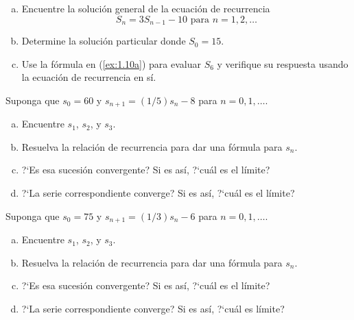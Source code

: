 \begin{solution}

\end{solution}

\begin{exercise}
\begin{enumerate}[(a)]
	\item Encuentre la solución general de la ecuación de recurrencia \[ S_{n}=3S_{n-1}-10\text{ para }n=1,2,\ldots \]\label{ex:1.10a}
	\item Determine la solución particular donde $S_{0}=15$.
	\item Use la fórmula en (\eqref{ex:1.10a}) para evaluar $S_6$ y verifique su respuesta usando la ecuación de recurrencia en sí.
\end{enumerate}
\end{exercise}

\begin{solution}
	
\end{solution}

\begin{exercise}
Suponga que $s_{0}=60$ y $s_{n+1}=(1/5)s_n-8$ para $n=0,1,\ldots$.
\begin{enumerate}[(a)]
	\item Encuentre $s_{1}$, $s_{2}$, y $s_{3}$.
	\item Resuelva la relación de recurrencia para dar una fórmula para $s_{n}$.
	\item ?`Es esa sucesión convergente? Si es así, ?`cuál es el límite?
	\item ?`La serie correspondiente converge? Si es así, ?`cuál es el límite?
\end{enumerate}
\end{exercise}

\begin{solution}
	
\end{solution}

\begin{exercise}
Suponga que $s_{0}=75$ y $s_{n+1}=(1/3)s_{n}-6$ para $n=0,1,\ldots$.
\begin{enumerate}[(a)]
	\item Encuentre $s_{1}$, $s_{2}$, y $s_{3}$.
	\item Resuelva la relación de recurrencia para dar una fórmula para $s_{n}$.
	\item ?`Es esa sucesión convergente? Si es así, ?`cuál es el límite?
	\item ?`La serie correspondiente converge? Si es así, ?`cuál es límite?
\end{enumerate}
\end{exercise}

